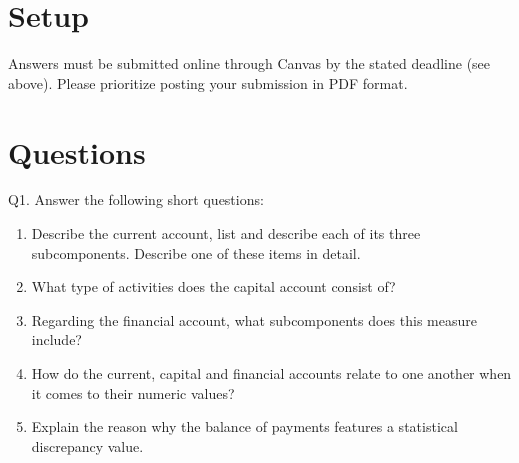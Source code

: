 \documentclass[12pt]{article}
\begin{document}
\singlespacing


\bigskip

\doublespacing



\section*{Setup}

\noindent 
Answers must be submitted online through Canvas by the stated deadline (see above).
Please prioritize posting your submission in PDF format.

\section*{Questions}

\noindent Q1. Answer the following short questions:

\begin{enumerate}[1)]
	
	\item Describe the current account, list and describe each of its three subcomponents. Describe one of these items in detail. 
	
	\vspace{2in}
	
	\item What type of activities does the capital account consist of?
	
	\vspace{2in}
	
	\newpage
	
	\item Regarding the financial account, what subcomponents does this measure include?
	
	\vspace{2.5in}
	
	\item How do the current, capital and financial accounts relate to one another when it comes to their numeric values?  
	
	\vspace{2.5in}
	
	\item Explain the reason why the balance of payments features a statistical discrepancy value.
	
	\vspace{1in}
	
\end{enumerate}
\end{document}
